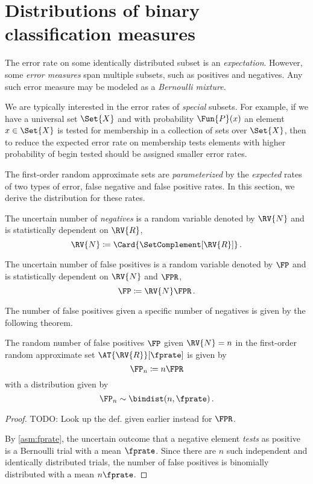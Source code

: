 \documentclass[ ../main.tex]{subfiles}
\begin{document}
\section{Distributions of binary classification measures}
\label{sec:characteristics}
The error rate on some identically distributed subset is an \emph{expectation}.
However, some \emph{error measures} span multiple subsets, such as positives and negatives.
Any such error measure may be modeled as a \emph{Bernoulli mixture}.

We are typically interested in the error rates of \emph{special} subsets.
For example, if we have a universal set $\Set{X}$ and with probability $\Fun{P}(x)$ an element $x \in \Set{X}$ is tested for membership in a collection of sets over $\Set{X}$, then to reduce the expected error rate on membership tests elements with higher probability of begin tested should be assigned smaller error rates.


The first-order random approximate sets are \emph{parameterized} by the \emph{expected} rates of two types of error, false negative and false positive rates.
In this section, we derive the distribution for these rates.

\begin{definition}
The uncertain number of \emph{negatives} is a random variable denoted by $\RV{N}$ and is statistically dependent on $\RV{R}$,
\begin{equation}
\RV{N} \coloneqq \Card{\SetComplement[\RV{R}]}\,.
\end{equation}
\end{definition}

\begin{definition}
The uncertain number of false positives is a random variable denoted by $\FP$ and is statistically dependent on $\RV{N}$ and $\FPR$,
\begin{equation}
	\FP \coloneqq \RV{N} \FPR\,.
\end{equation}
\end{definition}

The number of false positives given a specific number of negatives is given by the following theorem.
\begin{theorem}
\label{thm:fpbinom}
The random number of false positives $\FP$ given $\RV{N} = n$ in the first-order random approximate set $\AT{\RV{R}}[\fprate]$ is given by
\begin{equation}
	\FP_n \coloneqq n \FPR
\end{equation}
with a distribution given by
\begin{equation}
    \FP_n \sim \bindist(n, \fprate)\,.
\end{equation}
\end{theorem}
\begin{proof}
TODO: Look up the def. given earlier instead for $\FPR$.

By \cref{asm:fprate}, the uncertain outcome that a negative element \emph{tests} as positive is a Bernoulli trial with a mean $\fprate$.
Since there are $n$ such independent and identically distributed trials, the number of false positives is binomially distributed with a mean $n \fprate$.
\end{proof}
\end{document}
